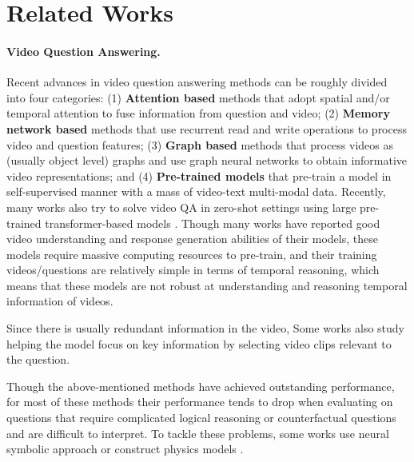 \documentclass[letterpaper]{article} %
\begin{document}
\section{Related Works}

\paragraph{Video Question Answering.}
Recent advances in video question answering methods can be roughly divided into four categories:
(1) \textbf{Attention based} methods \cite{Zhang2019OpenEndedLV,Li2019BeyondRP,Kumar2019LeveragingTA} that adopt spatial and/or temporal attention to fuse information from question and video;
(2) \textbf{Memory network based} methods \cite{Xu2017VideoQA,Gao2018MotionAppearanceCN,Fan2019HeterogeneousME,Kim2019ProgressiveAM} that use recurrent read and write operations to process video and question features;
(3) \textbf{Graph based} methods \cite{Jin2021AdaptiveSG,seo2021attend,Xiao2021VideoAC, Cherian2022251D, Park2021BridgeTA,Zhao2022Collaborative} that process videos as (usually object level) graphs and use graph neural networks to obtain informative video representations; and 
(4) \textbf{Pre-trained models} \cite{Lei2021LessIM,Fu2021VIOLETE,Zellers2021MERLOTMN,Zellers2022MERLOTRN,Wang2023Vstar} that pre-train a model in self-supervised manner with a mass of video-text multi-modal data. Recently, many works also try to solve video QA in zero-shot settings using large pre-trained transformer-based models \cite{Alayrac2022FlamingoAV, Li2023VideoChatCV, Zhang2023VideoLLaMAAI, Lyu2023MacawLLMML}. Though many works have reported good video understanding and response generation abilities of their models, these models require massive computing resources to pre-train, and their training videos/questions are relatively simple in terms of temporal reasoning, which means that these models are not robust at understanding and reasoning temporal information of videos.

Since there is usually redundant information in the video, Some works \cite{Kim2020ModalitySA, Gao2022MISTMI, Li2022InvariantGF} also study helping the model focus on key information by selecting video clips relevant to the question.

Though the above-mentioned methods have achieved outstanding performance, for most of these methods their performance tends to drop when evaluating on questions that require complicated logical reasoning or counterfactual questions and are difficult to interpret. To tackle these problems, some works use neural symbolic approach \cite{yi2019clevrer} \cite{Qian2022DynamicSM} or construct physics models \cite{Ding2021DynamicVR,chen2021grounding}.
\end{document}
